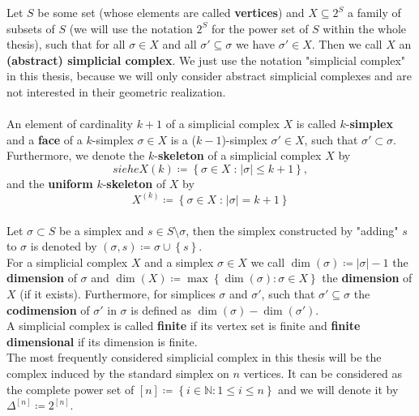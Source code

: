 Let \(S\) be some set (whose elements are called \textbf{vertices}) and \(X\subseteq 2^S\) a family of subsets of \(S\) (we will use the notation \(2^S\) for the power set of \(S\) within the whole thesis), such that for all \(\sigma\in X\) and all \(\sigma'\subseteq\sigma\) we have \(\sigma'\in X\). Then we call \(X\) an \textbf{(abstract) simplicial complex}. We just use the notation "simplicial complex" in this thesis, because we will only consider abstract simplicial complexes and are not interested in their geometric realization.\\
\\
An element of cardinality \(k+1\) of a simplicial complex \(X\) is called \(k\)-\textbf{simplex}  and a \textbf{face} of a \(k\)-simplex \(\sigma\in X\) is a (\(k-1\))-simplex \(\sigma'\in X\), such that \(\sigma'\subset\sigma\). Furthermore, we denote the \(k\)-\textbf{skeleton}  of a simplicial complex \(X\) by
\[siehe 
X(k)\coloneqq \left\{\sigma\in X\;\text{:}\;\left|\sigma\right|\leq k+1\right\},
\]
and the \textbf{uniform} \(k\)-\textbf{skeleton} of \(X\) by
\[
X^{(k)}\coloneqq \left\{\sigma\in X\;\text{:}\;\left|\sigma\right|=k+1\right\}
\]
\\
Let \(\sigma\subset S\) be a simplex and \(s\in S\setminus\sigma\), then the simplex constructed by "adding" \(s\) to \(\sigma\) is denoted by \((\sigma,s)\coloneqq \sigma\cup\left\{s\right\}\).\\
For a simplicial complex \(X\) and a simplex \(\sigma\in X\) we call \(\dim(\sigma)\coloneqq |\sigma|-1\) the \textbf{dimension} of \(\sigma\) and \(\dim(X)\coloneqq \max\left\{\dim(\sigma):\sigma\in X\right\}\) the \textbf{dimension} of \(X\) (if it exists). Furthermore, for simplices \(\sigma\) and \(\sigma'\), such that \(\sigma'\subseteq\sigma\) the \textbf{codimension} of \(\sigma'\) in \(\sigma\) is defined as \(\dim(\sigma)-\dim(\sigma')\). 
\\
A simplicial complex is called \textbf{finite} if its vertex set is finite and \textbf{finite dimensional} if its dimension is finite.\\
The most frequently considered simplicial complex in this thesis will be the complex induced by the standard simplex on \(n\) vertices. It can be considered as the complete power set of \([n]\coloneqq\left\{i\in\mathbb{N}:1\leq i\leq n\right\}\) and we will denote it by \(\Delta^{[n]}\coloneqq 2^{[n]}\).


